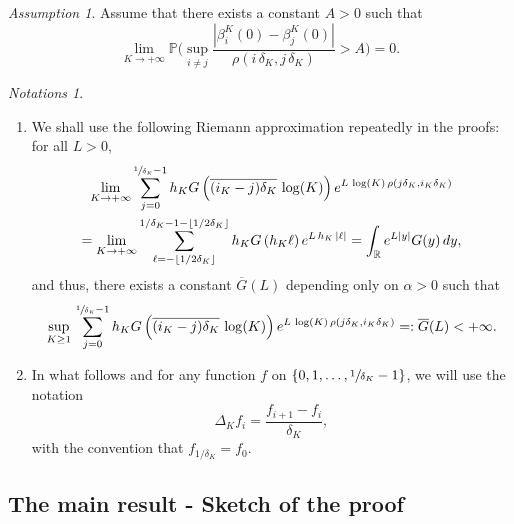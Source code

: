 \documentclass[10pt]{amsart}
\newenvironment{enumeratei}
{\bgroup\def\theenumi{\roman{enumi}}\def\theenumii{\arabic{enumii}}\begin{enumerate}}
{\end{enumerate}\egroup}
\theoremstyle{plain}
\theoremstyle{remark}
\newtheorem{hyp}[theorem]{Assumption}
\newtheorem*{notations}{Notations}
\begin{document}
\begin{hyp}\label{hypconvergence}
\noindent Assume that there exists a constant $A>0$ such that
\begin{equation*}%
\lim_{K\to+\infty}\mathbb{P}\Big(\sup_{i\neq j}\frac{|\beta^K_i(0)-\beta^K_j(0)|}{\rho(i\, \delta_K,j\, \delta_K)}> A\Big)=0.
\end{equation*}
\end{hyp}

\skpt
\begin{notations}
\begin{enumeratei}
\item
We shall use the following Riemann approximation repeatedly in the proofs: for all $L>0$,
\begin{multline*}%
\lim_{K\to +\infty}\sum_{j=0}^{\sfrac{1}{\delta_K}-1} h_K G\left(\overline{(i_K-j)\delta_K}\,\log(K)\right) e^{ L\,\log(K)\, \rho(j \delta_K,i_K \delta_K)}\\
=\lim_{K\to +\infty} \sum_{\ell=-\lfloor 1/2\delta_K\rfloor}^{1/\delta_K-1-\lfloor 1/2\delta_K\rfloor} h_K G\left(h_K\ell\right)e^{ L\,{h_K} \, | {\ell} |}
=\int_{\mathbb{R}}e^{L |y|}G(y)\,dy,
\end{multline*}
and thus, there exists a constant $\overline{G}(L)$ depending only on $\alpha>0$ such that 
\begin{equation}\label{eq:conv_moment-expo}
\sup_{K\geq 1}\,\sum_{j=0}^{\sfrac{1}{\delta_K}-1} h_K G\left(\overline{(i_K-j)\delta_K}\,\log(K)\right)e^{ L\,\log(K)\, \rho(j \delta_K,i_K \delta_K)} =: \overline G(L)<+\infty.
\end{equation}

\item
In what follows and for any function $f$ on $ \{0, 1,\dots, \sfrac{1}{\delta_K}-1\}$, we will use the notation
\[\Delta_Kf_i= \frac{f_{i+1}-f_i}{\delta_K},\]
with the convention that $f_{1/\delta_K}=f_0$.
\end{enumeratei}
\end{notations}

\subsection{The main result - Sketch of the proof}
\end{document}
